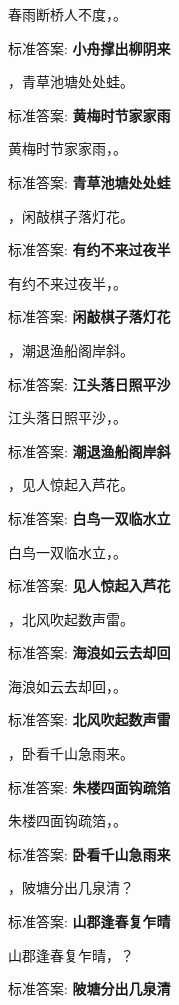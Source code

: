 \documentclass[12pt, a4paper, addpoints]{exam}
\begin{document}
\begin{questions}
\question[1] 春雨断桥人不度，\uline{\qquad\qquad\qquad}。

标准答案: \textbf{小舟撑出柳阴来}

\question[1] \uline{\qquad\qquad\qquad}，青草池塘处处蛙。

标准答案: \textbf{黄梅时节家家雨}

\question[1] 黄梅时节家家雨，\uline{\qquad\qquad\qquad}。

标准答案: \textbf{青草池塘处处蛙}

\question[1] \uline{\qquad\qquad\qquad}，闲敲棋子落灯花。

标准答案: \textbf{有约不来过夜半}

\question[1] 有约不来过夜半，\uline{\qquad\qquad\qquad}。

标准答案: \textbf{闲敲棋子落灯花}

\question[1] \uline{\qquad\qquad\qquad}，潮退渔船阁岸斜。

标准答案: \textbf{江头落日照平沙}

\question[1] 江头落日照平沙，\uline{\qquad\qquad\qquad}。

标准答案: \textbf{潮退渔船阁岸斜}

\question[1] \uline{\qquad\qquad\qquad}，见人惊起入芦花。

标准答案: \textbf{白鸟一双临水立}

\question[1] 白鸟一双临水立，\uline{\qquad\qquad\qquad}。

标准答案: \textbf{见人惊起入芦花}

\question[1] \uline{\qquad\qquad\qquad}，北风吹起数声雷。

标准答案: \textbf{海浪如云去却回}

\question[1] 海浪如云去却回，\uline{\qquad\qquad\qquad}。

标准答案: \textbf{北风吹起数声雷}

\question[1] \uline{\qquad\qquad\qquad}，卧看千山急雨来。

标准答案: \textbf{朱楼四面钩疏箔}

\question[1] 朱楼四面钩疏箔，\uline{\qquad\qquad\qquad}。

标准答案: \textbf{卧看千山急雨来}

\question[1] \uline{\qquad\qquad\qquad}，陂塘分出几泉清？

标准答案: \textbf{山郡逢春复乍晴}

\question[1] 山郡逢春复乍晴，\uline{\qquad\qquad\qquad}？

标准答案: \textbf{陂塘分出几泉清}


\end{questions}
\end{document}
